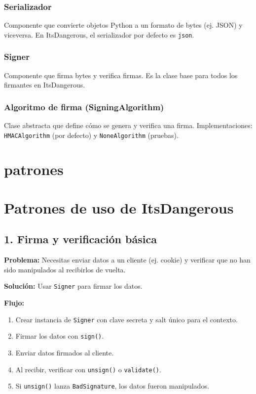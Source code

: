 \documentclass[11pt,a4paper]{article}
\begin{document}
\subsubsection*{Serializador}


Componente que convierte objetos Python a un formato de bytes (ej. JSON) y viceversa. En ItsDangerous, el serializador por defecto es \texttt{json}.


\subsubsection*{Signer}


Componente que firma bytes y verifica firmas. Es la clase base para todos los firmantes en ItsDangerous.


\subsubsection*{Algoritmo de firma (SigningAlgorithm)}


Clase abstracta que define cómo se genera y verifica una firma. Implementaciones: \texttt{HMACAlgorithm} (por defecto) y \texttt{NoneAlgorithm} (pruebas).


\section*{patrones}

\section*{Patrones de uso de ItsDangerous}


\subsection*{1. Firma y verificación básica}


\textbf{Problema:} Necesitas enviar datos a un cliente (ej. cookie) y verificar que no han sido manipulados al recibirlos de vuelta.


\textbf{Solución:} Usar \texttt{Signer} para firmar los datos.


\textbf{Flujo:}


\begin{enumerate}[leftmargin=*,topsep=2pt,itemsep=1pt]
  \item Crear instancia de \texttt{Signer} con clave secreta y salt único para el contexto.
  \item Firmar los datos con \texttt{sign()}.
  \item Enviar datos firmados al cliente.
  \item Al recibir, verificar con \texttt{unsign()} o \texttt{validate()}.
  \item Si \texttt{unsign()} lanza \texttt{BadSignature}, los datos fueron manipulados.
\end{enumerate}
\end{document}
